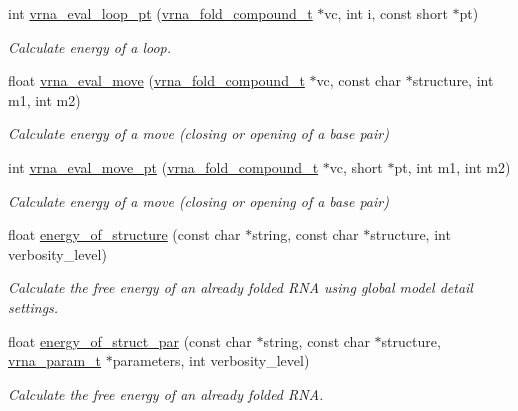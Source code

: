 \begin{DoxyCompactItemize}
int \hyperlink{group__eval_ga730ba4df55c02fd530a0cddd49faf760}{vrna\+\_\+eval\+\_\+loop\+\_\+pt} (\hyperlink{group__fold__compound_ga1b0cef17fd40466cef5968eaeeff6166}{vrna\+\_\+fold\+\_\+compound\+\_\+t} $\ast$vc, int i, const short $\ast$pt)
\begin{DoxyCompactList}\small\item\em Calculate energy of a loop. \end{DoxyCompactList}\item 
float \hyperlink{group__eval_gaff1b9e4f4d17b434b0a822fe783672c1}{vrna\+\_\+eval\+\_\+move} (\hyperlink{group__fold__compound_ga1b0cef17fd40466cef5968eaeeff6166}{vrna\+\_\+fold\+\_\+compound\+\_\+t} $\ast$vc, const char $\ast$structure, int m1, int m2)
\begin{DoxyCompactList}\small\item\em Calculate energy of a move (closing or opening of a base pair) \end{DoxyCompactList}\item 
int \hyperlink{group__eval_ga123dabc119ea98c968a5e903cc46f0fb}{vrna\+\_\+eval\+\_\+move\+\_\+pt} (\hyperlink{group__fold__compound_ga1b0cef17fd40466cef5968eaeeff6166}{vrna\+\_\+fold\+\_\+compound\+\_\+t} $\ast$vc, short $\ast$pt, int m1, int m2)
\begin{DoxyCompactList}\small\item\em Calculate energy of a move (closing or opening of a base pair) \end{DoxyCompactList}\item 
float \hyperlink{group__eval_gaf93986cb3cb29770ec9cca69c9fab8cf}{energy\+\_\+of\+\_\+structure} (const char $\ast$string, const char $\ast$structure, int verbosity\+\_\+level)
\begin{DoxyCompactList}\small\item\em Calculate the free energy of an already folded R\+N\+A using global model detail settings. \end{DoxyCompactList}\item 
float \hyperlink{group__eval_gaf9d064d3c496de42eca6734a96fd2090}{energy\+\_\+of\+\_\+struct\+\_\+par} (const char $\ast$string, const char $\ast$structure, \hyperlink{group__energy__parameters_ga8a69ca7d787e4fd6079914f5343a1f35}{vrna\+\_\+param\+\_\+t} $\ast$parameters, int verbosity\+\_\+level)
\begin{DoxyCompactList}\small\item\em Calculate the free energy of an already folded R\+N\+A. \end{DoxyCompactList}\item 

\end{DoxyCompactItemize}
